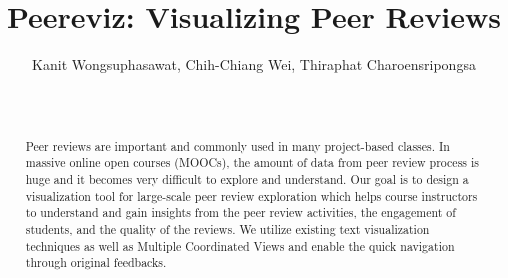 \documentclass{sigchi}
\begin{document}
\title{Peereviz: Visualizing Peer Reviews}


\author{
  \alignauthor Kanit Wongsuphasawat, Chih-Chiang Wei, Thiraphat Charoensripongsa\\
    \\
    \\
}



\maketitle

\begin{abstract}


Peer reviews are important and commonly used in many project-based classes. In
massive online open courses (MOOCs), the amount of data from peer review process is huge and it becomes very difficult to explore and understand. Our goal is to
design a visualization tool for large-scale peer review exploration which helps
course instructors to understand and gain insights from the peer review
activities, the engagement of students, and the quality of the reviews. We
utilize existing text visualization techniques as well as  Multiple Coordinated Views and enable the quick navigation through original feedbacks.

\end{abstract}



\end{document}
